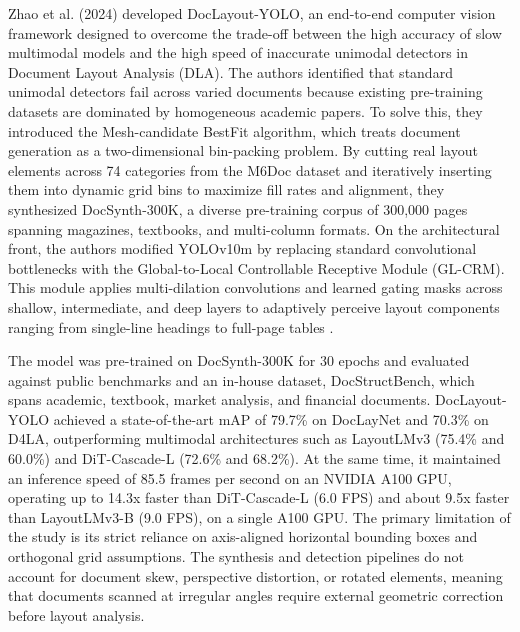 Zhao et al. (2024) developed DocLayout-YOLO, an end-to-end computer vision framework designed to overcome the trade-off between the high accuracy of slow multimodal models and the high speed of inaccurate unimodal detectors in Document Layout Analysis (DLA).
The authors identified that standard unimodal detectors fail across varied documents because existing pre-training datasets are dominated by homogeneous academic papers.
To solve this, they introduced the Mesh-candidate BestFit algorithm, which treats document generation as a two-dimensional bin-packing problem.
By cutting real layout elements across 74 categories from the M6Doc dataset and iteratively inserting them into dynamic grid bins to maximize fill rates and alignment, they synthesized DocSynth-300K, a diverse pre-training corpus of 300,000 pages spanning magazines, textbooks, and multi-column formats.
On the architectural front, the authors modified YOLOv10m by replacing standard convolutional bottlenecks with the Global-to-Local Controllable Receptive Module (GL-CRM).
This module applies multi-dilation convolutions and learned gating masks across shallow, intermediate, and deep layers to adaptively perceive layout components ranging from single-line headings to full-page tables \cite{ref50}.

The model was pre-trained on DocSynth-300K for 30 epochs and evaluated against public benchmarks and an in-house dataset, DocStructBench, which spans academic, textbook, market analysis, and financial documents.
DocLayout-YOLO achieved a state-of-the-art mAP of 79.7\% on DocLayNet and 70.3\% on D4LA, outperforming multimodal architectures such as LayoutLMv3 (75.4\% and 60.0\%) and DiT-Cascade-L (72.6\% and 68.2\%).
At the same time, it maintained an inference speed of 85.5 frames per second on an NVIDIA A100 GPU, operating up to 14.3x faster than DiT-Cascade-L (6.0 FPS) and about 9.5x faster than LayoutLMv3-B (9.0 FPS), on a single A100 GPU.
The primary limitation of the study is its strict reliance on axis-aligned horizontal bounding boxes and orthogonal grid assumptions.
The synthesis and detection pipelines do not account for document skew, perspective distortion, or rotated elements, meaning that documents scanned at irregular angles require external geometric correction before layout analysis.

